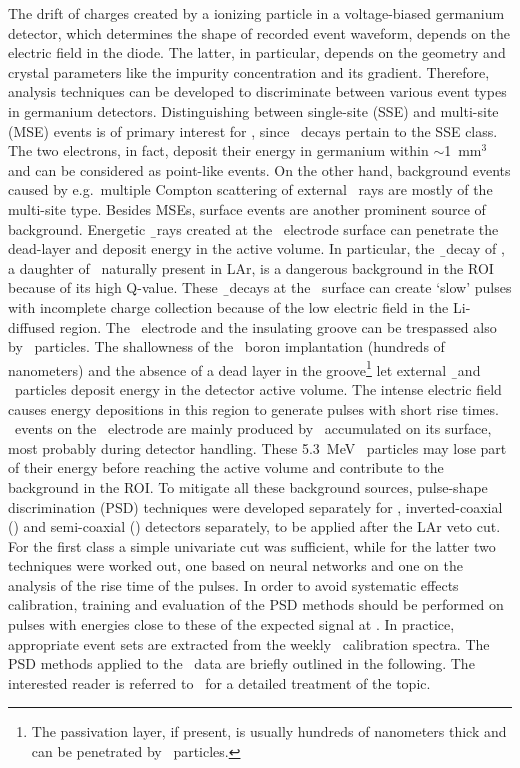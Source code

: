 The drift of charges created by a ionizing particle in a voltage-biased germanium
detector, which determines the shape of recorded event waveform, depends on the electric
field in the diode. The latter, in particular, depends on the geometry and crystal
parameters like the impurity concentration and its gradient. Therefore, analysis
techniques can be developed to discriminate between various event types in germanium
detectors. Distinguishing between single-site (SSE) and multi-site (MSE) events is of
primary interest for \gerda, since \onbb\ decays pertain to the SSE class. The two
electrons, in fact, deposit their energy in germanium within $\sim$1~mm$^3$ and can be
considered as point-like events. On the other hand, background events caused by
e.g.~multiple Compton scattering of external \g\ rays are mostly of the multi-site type.
Besides MSEs, surface events are another prominent source of background. Energetic \b\
rays created at the \nplus\ electrode surface can penetrate the dead-layer and deposit
energy in the active volume. In particular, the \b\ decay of \kvz, a daughter of \Arh\
naturally present in LAr, is a dangerous background in the ROI because of its high
Q-value. These \b\ decays at the \nplus\ surface can create `slow' pulses with incomplete
charge collection because of the low electric field in the Li-diffused region. The \pplus\
electrode and the insulating groove can be trespassed also by \a\ particles. The
shallowness of the \pplus\ boron implantation (hundreds of nanometers) and the
absence of a dead layer in the groove\footnote{%
  The passivation layer, if present, is usually hundreds of nanometers thick and can be
  penetrated by \a\ particles.
} let external \b\ and \a\ particles deposit energy in the detector active volume. The intense
electric field causes energy depositions in this region to generate pulses with short rise
times. \a\ events on the \pplus\ electrode are mainly produced by \Po\ accumulated on its
surface, most probably during detector handling. These 5.3~MeV \a\ particles may lose part
of their energy before reaching the active volume and contribute to the background in the
ROI.
\newpar
To mitigate all these background sources, pulse-shape discrimination (PSD) techniques were
developed separately for \bege, inverted-coaxial (\icoax) and semi-coaxial (\scoax)
detectors separately, to be applied after the LAr veto cut. For the first class a simple
univariate cut was sufficient, while for the latter two techniques were worked out, one
based on neural networks and one on the analysis of the rise time of the pulses.  In order
to avoid systematic effects calibration, training and evaluation of the PSD methods should
be performed on pulses with energies close to these of the expected signal at \qbb.  In
practice, appropriate event sets are extracted from the weekly \Th\ calibration spectra.
The PSD methods applied to the \gerda\ data are briefly outlined in the following. The
interested reader is referred to~\cite{Agostini2021a} for a detailed treatment of the
topic.

